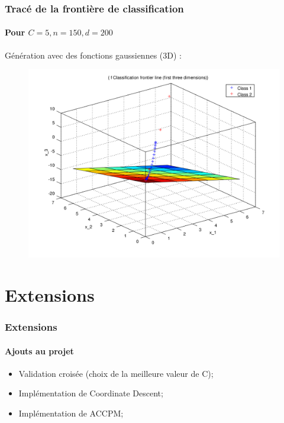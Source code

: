 \documentclass{beamer}
\begin{document}
\begin{frame}
\frametitle{Tracé de la frontière de classification}
\framesubtitle{Pour $C = 5, n = 150, d = 200$}

Génération avec des fonctions gaussiennes (3D) :

         \begin{figure}
         \centering
         \includegraphics[scale=0.4]{images/plane5.png}
         \end{figure}

\end{frame}

\section{Extensions}

\begin{frame}
\frametitle{Extensions}
\framesubtitle{Ajouts au projet}

\begin{itemize}
\item Validation croisée (choix de la meilleure valeur de C);

\item Implémentation de Coordinate Descent;

\item Implémentation de ACCPM;
\end{itemize}

\end{frame}
\end{document}

